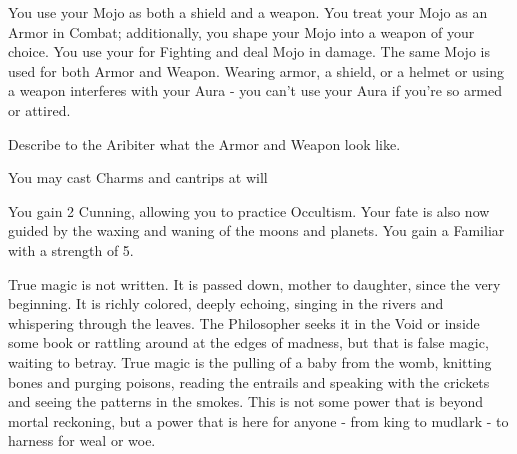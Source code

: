 {    



    You use your Mojo as both a shield and a weapon.  You treat your Mojo as an Armor \UD in Combat; additionally, you shape your Mojo into a weapon of your choice.  You use your \FOC for Fighting and deal Mojo \UD in damage. The same Mojo \UD is used for both Armor and Weapon.  Wearing armor, a shield, or a helmet or using a weapon interferes with your Aura - you can't use your Aura if you're so armed or attired.

    Describe to the Aribiter what the Armor and Weapon look like.


    You may cast Charms and cantrips at will\footnotemark


    You gain 2 Cunning, allowing you to practice Occultism.  Your fate is also now guided by the waxing and waning of the moons and planets.  You gain a Familiar with a strength of 5.\footnotemark[\value{footnote}]


    True magic is not written. It is passed down, mother to daughter, since the very beginning.  It is richly colored, deeply echoing, singing in the rivers and whispering through the leaves.  The Philosopher seeks it in the Void or inside some book or rattling around at the edges of madness, but that is false magic, waiting to betray.  True magic is the pulling of a baby from the womb, knitting bones and purging poisons, reading the entrails and speaking with the crickets and seeing the patterns in the smokes. This is not some power that is beyond mortal reckoning, but a power that is here for anyone - from king to mudlark - to harness for weal or woe.

}
